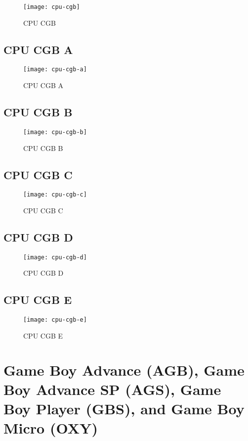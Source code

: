 \begin{figure}[H]
  \centering
  \texttt{[image: cpu-cgb]}
  \caption{CPU CGB}
\end{figure}

\subsection{CPU CGB A}

\begin{figure}[H]
  \centering
  \texttt{[image: cpu-cgb-a]}
  \caption{CPU CGB A}
\end{figure}

\subsection{CPU CGB B}

\begin{figure}[H]
  \centering
  \texttt{[image: cpu-cgb-b]}
  \caption{CPU CGB B}
\end{figure}

\subsection{CPU CGB C}

\begin{figure}[H]
  \centering
  \texttt{[image: cpu-cgb-c]}
  \caption{CPU CGB C}
\end{figure}

\subsection{CPU CGB D}

\begin{figure}[H]
  \centering
  \texttt{[image: cpu-cgb-d]}
  \caption{CPU CGB D}
\end{figure}

\subsection{CPU CGB E}

\begin{figure}[H]
  \centering
  \texttt{[image: cpu-cgb-e]}
  \caption{CPU CGB E}
\end{figure}

\section{Game Boy Advance (AGB), Game Boy Advance SP (AGS), Game Boy Player (GBS), and Game Boy Micro (OXY)}

